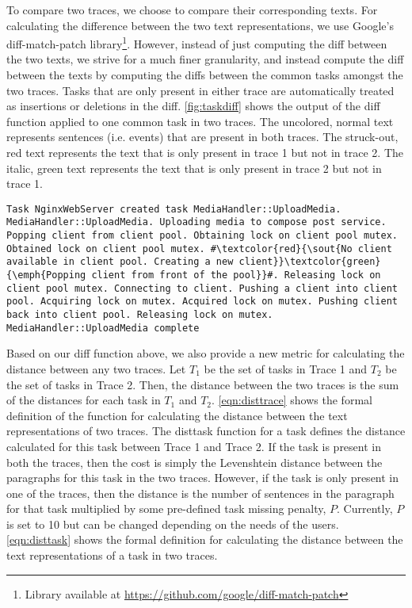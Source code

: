 To compare two traces, we choose to compare their corresponding texts. For calculating the difference
between the two text representations, we use Google's diff-match-patch library\footnote{Library available at \url{https://github.com/google/diff-match-patch}}.
However, instead of just computing the diff between the two texts, we strive for a much finer granularity, and instead
compute the diff between the texts by computing the diffs between the common tasks amongst the two traces.
Tasks that are only present in either trace are automatically treated as insertions or deletions in the diff.
\autoref{fig:taskdiff} shows the output of the diff function applied to one common task in two traces.
The uncolored, normal text represents sentences (i.e. events) that are present in both traces. The struck-out,
red text represents the text that is only present in trace 1 but not in trace 2. The italic, green text represents
the text that is only present in trace 2 but not in trace 1.

\begin{lstlisting}[caption={Text Difference for a task from 2 traces},captionpos=b,label={fig:taskdiff}, escapechar=\#]
    Task NginxWebServer created task MediaHandler::UploadMedia. MediaHandler::UploadMedia. Uploading media to compose post service. Popping client from client pool. Obtaining lock on client pool mutex. Obtained lock on client pool mutex. #\textcolor{red}{\sout{No client available in client pool. Creating a new client}}\textcolor{green}{\emph{Popping client from front of the pool}}#. Releasing lock on client pool mutex. Connecting to client. Pushing a client into client pool. Acquiring lock on mutex. Acquired lock on mutex. Pushing client back into client pool. Releasing lock on mutex. MediaHandler::UploadMedia complete
\end{lstlisting}

 Based on our diff function above, we also provide a new metric for calculating
the distance between any two traces. Let $T_1$ be the set of tasks in Trace 1 and $T_2$ be the set
of tasks in Trace 2. Then, the distance between the two traces is the sum of the distances for each task
in $T_1$ and $T_2$. \autoref{eqn:disttrace} shows the formal definition of the function for calculating
the distance between the text representations of two traces.
The disttask function for a task defines the distance calculated for this task between Trace 1 and Trace 2.
If the task is present in both the traces, then the cost is simply the Levenshtein distance between the paragraphs
for this task in the two traces. However, if the task is only present in one of the traces, then the distance is
the number of sentences in the paragraph for that task multiplied by some pre-defined task missing penalty, $P$.
Currently, $P$ is set to 10 but can be changed depending on the needs of the users. \autoref{eqn:disttask}
shows the formal definition for calculating the distance between the text representations of a task in two traces.
